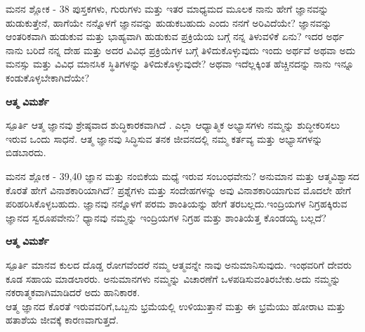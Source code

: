 \newpage
\begin{mananam}{\mananamfont ಮನನ ಶ್ಲೋಕ - \textenglish{38}}
\footnotesize \mananamtext ಪುಸ್ತಕಗಳು, ಗುರುಗಳು ಮತ್ತು ಇತರ ಮಾಧ್ಯಮದ ಮೂಲಕ ನಾನು ಹೇಗೆ ಜ್ಞಾನವನ್ನು ಹುಡುಕುತ್ತೇನೆ, ಹಾಗೆಯೇ ನನ್ನೊಳಗೆ ಜ್ಞಾನವನ್ನು ಹುಡುಕಬಹುದು ಎಂದು ನನಗೆ ಅರಿವಿದೆಯೇ? ಜ್ಞಾನವನ್ನು ಆಂತರಿಕವಾಗಿ ಹುಡುಕುವ ಮತ್ತು ಭಾಹ್ಯವಾಗಿ ಹುಡುಕುವ ಪ್ರಕ್ರಿಯೆಯ ಬಗ್ಗೆ ನನ್ನ ತಿಳುವಳಿಕೆ ಏನು? ಇದರ ಅರ್ಥ ನಾನು ಬರಿದೆ ನನ್ನ ದೇಹ ಮತ್ತು ಅದರ ವಿವಿಧ ಪ್ರಕ್ರಿಯೆಗಳ ಬಗ್ಗೆ ತಿಳಿದುಕೊಳ್ಳುವುದು ಇಂದು ಅರ್ಥವೆ ಅಥವಾ ಅದು ಮನಸ್ಸು ಮತ್ತು ವಿವಿಧ ಮಾನಸಿಕ ಸ್ಥಿತಿಗಳನ್ನು  ತಿಳಿದುಕೊಳ್ಳುವುದೇ?    ಅಥವಾ ಇದೆಲ್ಲಕ್ಕಿಂತ ಹೆಚ್ಚಿನದನ್ನು ನಾನು ಇನ್ನೂ ಕಂಡುಕೊಳ್ಳಬೇಕಾಗಿದೆಯೇ?\\
\end{mananam}
\WritingHand\enspace\textbf{ಆತ್ಮ ವಿಮರ್ಶೆ}\\
\begin{inspiration}{\mananamfont ಸ್ಪೂರ್ತಿ}
\footnotesize \mananamtext ಆತ್ಮ ಜ್ಞಾನವು ಶ್ರೇಷ್ಠವಾದ ಶುದ್ಧಿಕಾರಕವಾಗಿದೆ  . ಎಲ್ಲಾ ಆಧ್ಯಾತ್ಮಿಕ ಅಭ್ಯಾಸಗಳು ನಮ್ಮನ್ನು ಶುದ್ಧೀಕರಿಸಲು ಇರುವ ಒಂದು ಸಾಧನೆ. ಆತ್ಮ ಜ್ಞಾನವು ಸಿದ್ಧಿಸುವ ತನಕ  ಜೀವನದಲ್ಲಿ ನಮ್ಮ ಕರ್ತವ್ಯ ಮತ್ತು ಅಭ್ಯಾಸಗಳನ್ನು ಬಿಡಬಾರದು.
\end{inspiration}
\newpage
 

\newpage
\begin{mananam}{\mananamfont ಮನನ ಶ್ಲೋಕ - \textenglish{39,40}}
\footnotesize \mananamtext ಜ್ಞಾನ ಮತ್ತು ನಂಬಿಕೆಯ ಮಧ್ಯೆ ಇರುವ ಸಂಬಂಧವೇನು? ಅನುಮಾನ ಮತ್ತು ಆತ್ಮವಿಶ್ವಾಸದ ಕೊರತೆ ಹೇಗೆ ವಿನಾಶಕಾರಿಯಾಗಿದೆ? ಪ್ರಶ್ನೆಗಳು ಮತ್ತು ಸಂದೇಹಗಳನ್ನು  ಅವು ವಿನಾಶಕಾರಿಯಾಗುವ ಮೊದಲೇ ಹೇಗೆ ಪರಿಹರಿಸಿಕೊಳ್ಳಬಹುದು. ಜ್ಞಾನವು ನನ್ನೊಳಗೆ ಪರಮ ಶಾಂತಿಯನ್ನು ಹೇಗೆ ತರಬಲ್ಲದು.ಇಂದ್ರಿಯಗಳ ನಿಗ್ರಹಕ್ಕಿರುವ ಜ್ಞಾನದ ಸ್ವರೂಪವೇನು? ಧ್ಯಾನವು ನಮ್ಮನ್ನು  ಇಂದ್ರಿಯಗಳ ನಿಗ್ರಹ ಮತ್ತು ಶಾಂತಿಯೆತ್ತ ಕೊಂಡಯ್ಯ ಬಲ್ಲದೆ?\\
\end{mananam}
\WritingHand\enspace\textbf{ಆತ್ಮ ವಿಮರ್ಶೆ}\\
\begin{inspiration}{\mananamfont ಸ್ಪೂರ್ತಿ}
\footnotesize \mananamtext ಮಾನವ ಕುಲದ ದೊಡ್ಡ ರೋಗವೆಂದರೆ ನಮ್ಮ ಆತ್ಮವನ್ನೇ ನಾವು ಅನುಮಾನಿಸುವುದು. ಇಂಥವರಿಗೆ ದೇವರು ಕೂಡ ಸಹಾಯ ಮಾಡಲಾರರು. ಅನುಮಾನಗಳು ನಮ್ಮನ್ನು ವಿಚಾರಣೆಗೆ ಒಳಪಡಿಸುವಂತಿರಬೇಕು.ಅದು ನಮ್ಮನ್ನು ನಕರಾತ್ಮಕವಾಗಿಮಾಡಿದರೆ ಅದು ಹಾನಿಕಾರಕ.\\
 ಆತ್ಮ ಜ್ಞಾನದ ಕೊರತೆ ಇರುವವರಿಗೆ,ಒಬ್ಬನು ಭ್ರಮೆಯಲ್ಲಿ ಉಳಿಯುತ್ತಾನೆ ಮತ್ತು ಈ ಭ್ರಮೆಯು ಹೋರಾಟ ಮತ್ತು ಹತಾಶೆಯ ಜೀವಕ್ಕೆ ಕಾರಣವಾಗುತ್ತದೆ. 
\end{inspiration}
\newpage

